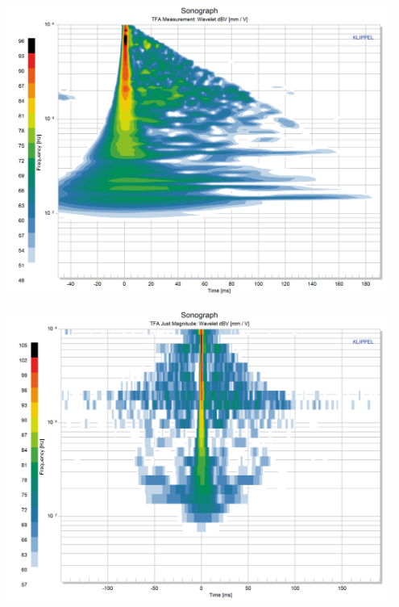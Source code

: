 \documentclass{report}
\begin{document}
\begin{minipage}{0.331\textwidth}
\begin{center}
	\includegraphics[width=0.95\textwidth]{RoomComp/Sonograph_Meas} 
    \captionsetup{hypcap=false} 
	\label{fig:comp_meas}
\end{center}
\end{minipage}
\begin{minipage}{0.331\textwidth}
\begin{center}
	\includegraphics[width=0.95\textwidth]{RoomComp/Sonograph_MagFilt} 
    \captionsetup{hypcap=false} 
	\label{fig:comp_mag}
\end{center}
\end{minipage}
\end{document}
